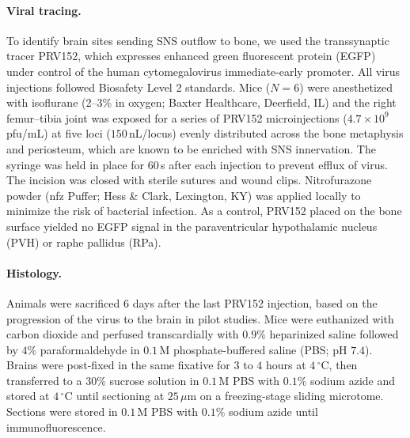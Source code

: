 \documentclass[11pt]{article}
\begin{document}
\paragraph{Viral tracing.} To identify brain sites sending SNS outflow to bone, we used the transsynaptic tracer PRV152, which expresses enhanced green fluorescent protein (EGFP) under control of the human cytomegalovirus immediate-early promoter. All virus injections followed Biosafety Level 2 standards. Mice ($N = 6$) were anesthetized with isoflurane (2--3\% in oxygen; Baxter Healthcare, Deerfield, IL) and the right femur--tibia joint was exposed for a series of PRV152 microinjections ($4.7 \times 10^9$\,pfu/mL) at five loci ($150$\,nL/locus) evenly distributed across the bone metaphysis and periosteum, which are known to be enriched with SNS innervation. The syringe was held in place for $60$\,s after each injection to prevent efflux of virus. The incision was closed with sterile sutures and wound clips. Nitrofurazone powder (nfz Puffer; Hess \& Clark, Lexington, KY) was applied locally to minimize the risk of bacterial infection. As a control, PRV152 placed on the bone surface yielded no EGFP signal in the paraventricular hypothalamic nucleus (PVH) or raphe pallidus (RPa).

\paragraph{Histology.} Animals were sacrificed $6$ days after the last PRV152 injection, based on the progression of the virus to the brain in pilot studies. Mice were euthanized with carbon dioxide and perfused transcardially with $0.9\%$ heparinized saline followed by $4\%$ paraformaldehyde in $0.1$\,M phosphate-buffered saline (PBS; pH $7.4$). Brains were post-fixed in the same fixative for $3$ to $4$ hours at $4\,^\circ\mathrm{C}$, then transferred to a $30\%$ sucrose solution in $0.1$\,M PBS with $0.1\%$ sodium azide and stored at $4\,^\circ\mathrm{C}$ until sectioning at $25\,\mu\mathrm{m}$ on a freezing-stage sliding microtome. Sections were stored in $0.1$\,M PBS with $0.1\%$ sodium azide until immunofluorescence.
\end{document}

